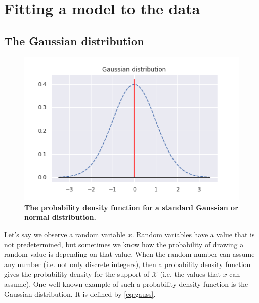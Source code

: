 \chapter{Fitting a model to the data}\label{ap:prob_theory}

\section{The Gaussian distribution}

\begin{figure}
    \centering
    \includegraphics[width=\linewidth]{figs/normal_dist.png}
    \caption[The probability density function for a standard Gaussian or normal distribution]{\small \textbf{The probability density function for a standard Gaussian or normal distribution.}}
    \label{fig:gauss}
\end{figure}


Let's say we observe a random variable $x$. Random variables have a value that is not predetermined, but sometimes we know how the probability of drawing a random value is depending on that value. When the random number can assume any number (i.e. not only discrete integers), then a probability density function gives the probability density for the support of $\mathcal{X}$ (i.e. the values that $x$ can assume). One well-known example of such a probability density function is the Gaussian distribution. It is defined by \ref{eq:gauss}.

